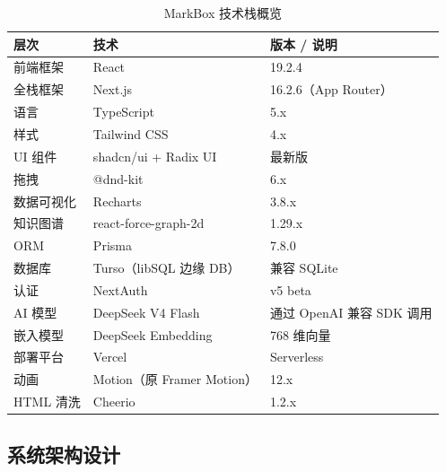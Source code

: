 \documentclass[12pt,a4paper]{ctexart}
\begin{document}
\begin{table}[H]
\centering
\caption{MarkBox 技术栈概览}
\label{tab:tech-stack}
\begin{tabular}{@{}lll@{}}
\toprule
\textbf{层次}   & \textbf{技术}          & \textbf{版本 / 说明}                  \\
\midrule
前端框架     & React                 & 19.2.4                               \\
全栈框架     & Next.js               & 16.2.6（App Router）                   \\
语言        & TypeScript            & 5.x                                  \\
样式        & Tailwind CSS          & 4.x                                  \\
UI 组件     & shadcn/ui + Radix UI  & 最新版                                 \\
拖拽        & @dnd-kit              & 6.x                                  \\
数据可视化    & Recharts              & 3.8.x                                \\
知识图谱     & react-force-graph-2d  & 1.29.x                               \\
ORM       & Prisma                & 7.8.0                                \\
数据库       & Turso（libSQL 边缘 DB）  & 兼容 SQLite                            \\
认证        & NextAuth              & v5 beta                              \\
AI 模型     & DeepSeek V4 Flash     & 通过 OpenAI 兼容 SDK 调用                 \\
嵌入模型     & DeepSeek Embedding    & 768 维向量                              \\
部署平台     & Vercel                & Serverless                           \\
动画        & Motion（原 Framer Motion） & 12.x                                 \\
HTML 清洗   & Cheerio               & 1.2.x                                \\
\bottomrule
\end{tabular}
\end{table}

\subsection{系统架构设计}
\end{document}
